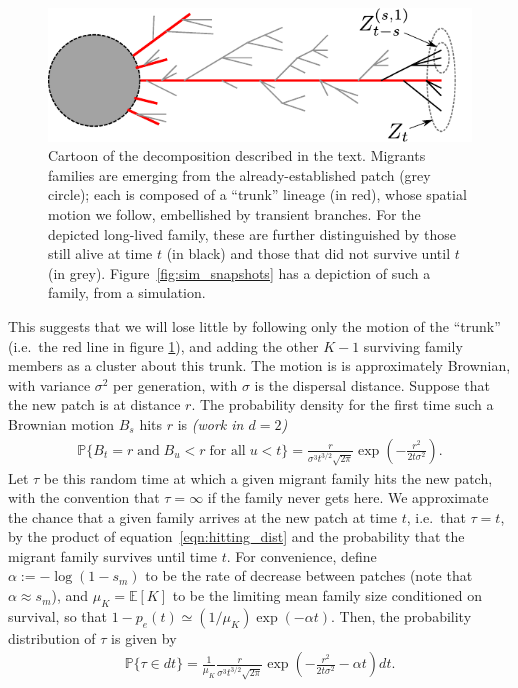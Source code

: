 \documentclass{article}
\renewcommand{\P}{\mathbb{P}}
\newcommand{\E}{\mathbb{E}}
\newcommand{\deq}{\stackrel{\scriptscriptstyle{d}}{=}}
\newcommand{\plr}[1]{{\it\color{blue}(#1)}}
\begin{document}
\begin{figure}[ht!!]
  \begin{center}
    \includegraphics{branching-concept}
  \end{center}
\caption{Cartoon of the decomposition described in the text.
Migrants families are emerging from the already-established patch (grey circle);
each is composed of a ``trunk'' lineage (in red), whose spatial motion we follow,
embellished by transient branches.
For the depicted long-lived family, these are further distinguished by those still alive at time $t$ (in black)
and those that did not survive until $t$ (in grey).
Figure~\ref{fig:sim_snapshots} has a depiction of such a family, from a simulation.
\label{fig:branching_decomp}
}
\end{figure}

This suggests that we will lose little by following only the motion of the ``trunk''
(i.e.\ the red line in figure \ref{fig:branching_decomp}),
and adding the other $K-1$ surviving family members as a cluster about this trunk.
The motion is is approximately Brownian, with variance $\sigma^2$ per generation,
with $\sigma$ is the dispersal distance.
Suppose that the new patch is at distance $r$.
The probability density for the first time such a Brownian motion $B_s$ hits $r$ is
\citep[XXX]{feller}
\plr{work in $d=2$}
\begin{align} \label{eqn:hitting_dist}
  \P\{ B_t=r \;\mbox{and} \; B_u<r \;\mbox{for all}\; u<t\} =  \frac{r}{\sigma^3 t^{3/2}\sqrt{2\pi}} \exp\left(-\frac{r^2}{2t\sigma^2}\right) .
\end{align}
Let $\tau$ be this random time at which a given migrant family hits the new patch,
with the convention that $\tau =\infty$ if the family never gets here.
We approximate the chance that a given family arrives at the new patch at time $t$, i.e.\ that $\tau=t$,
by the product of equation~\eqref{eqn:hitting_dist} and the probability that the migrant family survives until time $t$.
For convenience, define $\alpha := - \log(1-s_m)$ to be the rate of decrease between patches (note that $\alpha \approx s_m$),
and $\mu_K = \E[K]$ to be the limiting mean family size conditioned on survival,
so that $1-p_e(t) \simeq (1/\mu_K) \exp(-\alpha t)$.
Then, the probability distribution of $\tau$ is given by
\begin{align}
    \P\{ \tau \in dt \} =  \frac{1}{\mu_K} \frac{r}{\sigma^3 t^{3/2}\sqrt{2\pi}} \exp\left(-\frac{r^2}{2t\sigma^2} - \alpha t \right) dt  .
\end{align}
\end{document}
